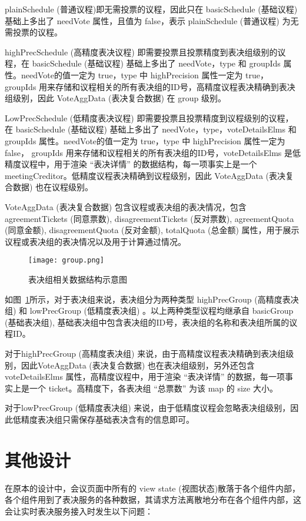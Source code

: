   plainSchedule (普通议程)即无需投票的议程，因此只在 basicSchedule (基础议程) 基础上多出了 needVote 属性，且值为 false，表示 plainSchedule (普通议程) 为无需投票的议程。

  highPrecSchedule (高精度表决议程) 即需要投票且投票精度到表决组级别的议程，在 basicSchedule (基础议程) 基础上多出了 needVote，type 和 groupIds 属性。needVote的值一定为 true，type 中 highPrecision 属性一定为 true， groupIds 用来存储和议程相关的所有表决组的ID号，高精度议程表决精确到表决组级别，因此 VoteAggData (表决复合数据) 在 group 级别。

  LowPrecSchedule (低精度表决议程) 即需要投票且投票精度到议程级别的议程，在 basicSchedule (基础议程) 基础上多出了 needVote，type，voteDetailsElms 和 groupIds 属性。needVote的值一定为 true，type 中 highPrecision 属性一定为 false， groupIds 用来存储和议程相关的所有表决组的ID号，voteDetailsElms 是低精度议程中，用于渲染 “表决详情” 的数据结构，每一项事实上是一个 meetingCreditor。低精度议程表决精确到议程级别，因此 VoteAggData (表决复合数据) 也在议程级别。

  VoteAggData (表决复合数据) 包含议程或表决组的表决情况，包含 agreementTickets (同意票数), disagreementTickets (反对票数), agreementQuota (同意金额), disagreementQuota (反对金额), totalQuota (总金额) 属性，用于展示议程或表决组的表决情况以及用于计算通过情况。

  \begin{figure}[!htp]
    \centering
    \texttt{[image: group.png]}
    \caption{表决组相关数据结构示意图}
   \label{fig:group}
  \end{figure}

  如图~\ref{fig:group}所示，对于表决组来说，表决组分为两种类型 highPrecGroup (高精度表决组) 和 lowPrecGroup (低精度表决组) 。以上两种类型议程均继承自 basicGroup (基础表决组), 基础表决组中包含表决组的ID号，表决组的名称和表决组所属的议程ID。

  对于highPrecGroup (高精度表决组) 来说，由于高精度议程表决精确到表决组级别，因此VoteAggData (表决复合数据) 也在表决组级别，另外还包含 voteDetailsElms 属性，高精度议程中，用于渲染 “表决详情” 的数据，每一项事实上是一个 ticket。高精度下，各表决组 “总票数” 为该 map 的 size 大小。

  对于lowPrecGroup (低精度表决组) 来说，由于低精度议程会忽略表决组级别，因此低精度表决组只需保存基础表决含有的信息即可。

  \section{其他设计}
  在原本的设计中，会议页面中所有的 view state (视图状态)散落于各个组件内部，各个组件用到了表决服务的各种数据，其请求方法离散地分布在各个组件内部，这会让实时表决服务接入时发生以下问题：

